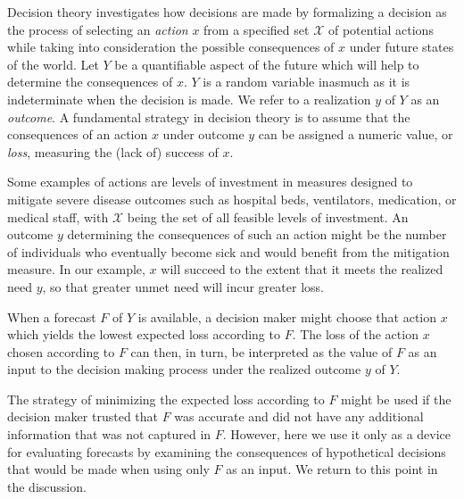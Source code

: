 \documentclass{article}\usepackage[]{graphicx}\usepackage[]{xcolor}
\begin{document}
Decision theory investigates how decisions are made by formalizing a decision as the process of selecting an
\emph{action} $x$ from a specified set $\mathcal{X}$ of potential actions while taking into consideration the possible
consequences of $x$ under future states of the world. Let $Y$ be a quantifiable aspect of the future which will help to
determine the consequences of $x$. $Y$ is a random variable inasmuch as it is indeterminate when the decision is made.
We refer to a realization $y$ of $Y$ as an \emph{outcome}. A fundamental strategy in decision theory is to assume that
the consequences of an action $x$ under outcome $y$ can be assigned a numeric value, or \emph{loss}, measuring the (lack
of) success of $x$.

Some examples of actions are levels of investment in measures designed to mitigate severe disease outcomes such as
hospital beds, ventilators, medication, or medical staff, with $\mathcal{X}$ being the set of all feasible levels of
investment. An outcome $y$ determining the consequences of such an action might be the number of individuals who
eventually become sick and would benefit from the mitigation measure. In our example, $x$ will succeed to the extent
that it meets the realized need $y$, so that greater unmet need will incur greater loss.

When a forecast $F$ of $Y$ is available, a decision maker might choose that action $x$ which yields the lowest expected
loss according to $F$. The loss of the action $x$ chosen according to $F$ can then, in turn, be interpreted as the value
of $F$ as an input to the decision making process under the realized outcome $y$ of $Y$.

The strategy of minimizing the expected loss according to $F$ might be used if the decision maker trusted that $F$ was
accurate and did not have any additional information that was not captured in $F$. However, here we use it only as a
device for evaluating forecasts by examining the consequences of hypothetical decisions that would be made when using
only $F$ as an input. We return to this point in the discussion.
\end{document}
